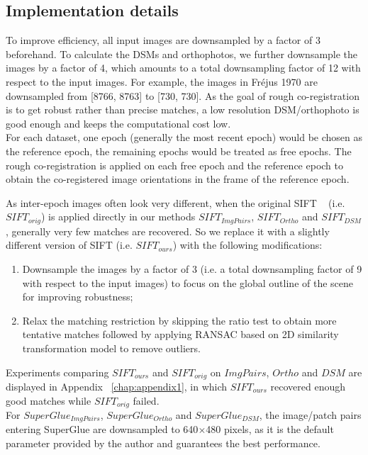\subsection{Implementation details}
To improve efficiency, all input images are downsampled by a factor of 3 beforehand. To calculate the DSMs and orthophotos, we further downsample the images by a factor of 4, which amounts to a total downsampling factor of 12 with respect to the input images. For example, the images in Fr{\'e}jus 1970 are downsampled from [8766, 8763] to [730, 730]. As the goal of rough co-registration is to get robust rather than precise matches, a low resolution DSM/orthophoto is good enough and keeps the computational cost low. \\
For each dataset, one epoch (generally the most recent epoch) would be chosen as the reference epoch, the remaining epochs would be treated as free epochs. The rough co-registration is applied on each free epoch and the reference epoch to obtain the co-registered image orientations in the frame of the reference epoch.
\par

As inter-epoch images often look very different, when the original SIFT ~\cite{lowe2004distinctive} (i.e. $SIFT_{orig}$) is applied directly in our methods $SIFT_{ImgPairs}$, $SIFT_{Ortho}$ and $SIFT_{DSM}$, generally very few matches are recovered. So we replace it with a slightly different version of SIFT (i.e.  $SIFT_{ours}$) with the following modifications:\\
\begin{enumerate}
	\item Downsample the images by a factor of 3 (i.e. a total downsampling factor of 9 with respect to the input images) to focus on the global outline of the scene for improving robustness;
	\item Relax the matching restriction by skipping the ratio test to obtain more tentative matches followed by applying RANSAC based on 2D similarity transformation model to remove outliers.
\end{enumerate}
Experiments comparing $SIFT_{ours}$ and $SIFT_{orig}$ on ${ImgPairs}$, ${Ortho}$ and ${DSM}$ are displayed in Appendix ~\ref{chap:appendix1}, in which $SIFT_{ours}$ recovered enough good matches while $SIFT_{orig}$ failed.\\

For $SuperGlue_{ImgPairs}$, $SuperGlue_{Ortho}$ and $SuperGlue_{DSM}$, the image/patch pairs entering SuperGlue are downsampled to 640$\times$480 pixels, as it is the default parameter provided by the author and guarantees the best performance.


